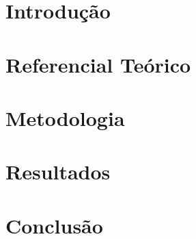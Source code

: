 \documentclass[12pt,oneside]{abntex2}
\begin{document}
\imprimircapa
\imprimirfolhaderosto

\sumario

\chapter{Introdução}
\lipsum[1-2]

\chapter{Referencial Teórico}
\lipsum[3-4]

\chapter{Metodologia}
\lipsum[5]

\chapter{Resultados}
\lipsum[6]

\chapter{Conclusão}
\lipsum[7]


\end{document}
